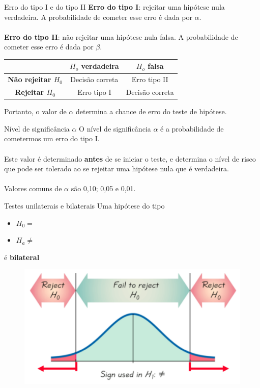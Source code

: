 \documentclass[10pt]{beamer}\usepackage[]{graphicx}\usepackage[]{color}
\theoremstyle{definition}
\begin{document}
\begin{frame}{Erro do tipo I e do tipo II}
  \textbf{Erro do tipo I}: rejeitar uma hipótese nula verdadeira. A
  probabilidade de cometer esse erro é dada por $\alpha$. \\~\\
  \textbf{Erro do tipo II}: não rejeitar uma hipótese nula falsa. A
  probabilidade de cometer esse erro é dada por $\beta$.
  \begin{table}[H]
    \centering
    \begin{tabular}{c|cc}
      \hline
       & \textbf{$H_o$ verdadeira} & \textbf{$H_o$ falsa} \\
       \hline
       \textbf{Não rejeitar $H_0$} & Decisão correta & Erro tipo II \\
       \textbf{Rejeitar $H_0$} & Erro tipo I & Decisão correta \\
       \hline
    \end{tabular}
  \end{table}
  Portanto, o valor de $\alpha$ determina a chance de erro do teste de
  hipótese.
\end{frame}

\begin{frame}{Nível de significância $\alpha$}
  O nível de significância $\alpha$ é a probabilidade de cometermos um
  erro do tipo I. \\~\\
  Este valor é determinado \textbf{antes} de se iniciar o teste, e
  determina o nível de risco que pode ser tolerado ao se rejeitar uma
  hipótese nula que é verdadeira. \\~\\
  Valores comuns de $\alpha$ são 0,10; 0,05 e 0,01.
\end{frame}

\begin{frame}{Testes unilaterais e bilaterais}
  Uma hipótese do tipo
  \begin{itemize}
  \item[] $H_0 = $
  \item[] $H_a \neq$
  \end{itemize}
  é \textbf{bilateral}
  \begin{figure}[H]
    \centering
    \includegraphics[width=.8\textwidth]{bilateral2}
  \end{figure}
\end{frame}
\end{document}
